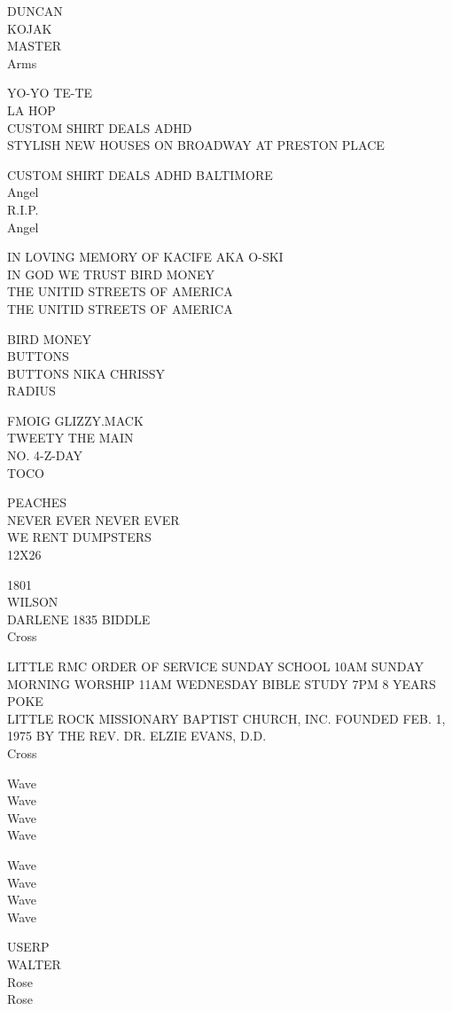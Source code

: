 \documentclass[10pt,letterpaper]{article}
\begin{document}
DUNCAN\\
KOJAK\\
MASTER\\
Arms

YO{-}YO TE{-}TE\\
LA HOP\\
CUSTOM SHIRT DEALS ADHD\\
STYLISH NEW HOUSES ON BROADWAY AT PRESTON PLACE

CUSTOM SHIRT DEALS ADHD BALTIMORE\\
Angel\\
R.I.P.\\
Angel

IN LOVING MEMORY OF KACIFE AKA O{-}SKI\\
IN GOD WE TRUST BIRD MONEY\\
THE UNITID STREETS OF AMERICA\\
THE UNITID STREETS OF AMERICA

BIRD MONEY\\
BUTTONS\\
BUTTONS NIKA CHRISSY\\
RADIUS

FMOIG GLIZZY.MACK\\
TWEETY THE MAIN\\
NO. 4{-}Z{-}DAY\\
TOCO

PEACHES\\
NEVER EVER NEVER EVER\\
WE RENT DUMPSTERS\\
12X26

1801\\
WILSON\\
DARLENE 1835 BIDDLE\\
Cross

LITTLE RMC ORDER OF SERVICE SUNDAY SCHOOL 10AM SUNDAY MORNING WORSHIP 11AM WEDNESDAY BIBLE STUDY 7PM 8 YEARS\\
POKE\\
LITTLE ROCK MISSIONARY BAPTIST CHURCH, INC. FOUNDED FEB. 1, 1975 BY THE REV. DR. ELZIE EVANS, D.D.\\
Cross

Wave\\
Wave\\
Wave\\
Wave

Wave\\
Wave\\
Wave\\
Wave

USERP\\
WALTER\\
Rose\\
Rose
\end{document}
